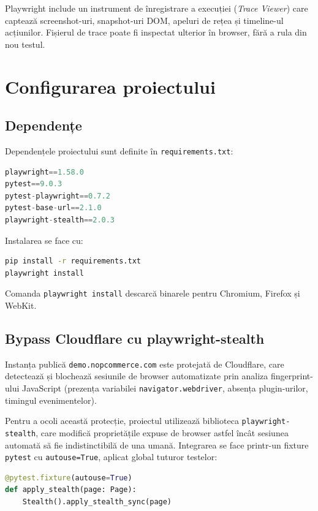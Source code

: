 Playwright include un instrument de înregistrare a execuției (\textit{Trace Viewer}) care
captează screenshot-uri, snapshot-uri DOM, apeluri de rețea și timeline-ul acțiunilor.
Fișierul de trace poate fi inspectat ulterior în browser, fără a rula din nou testul.

\section{Configurarea proiectului}

\subsection{Dependențe}

Dependențele proiectului sunt definite în \texttt{requirements.txt}:

\begin{lstlisting}[language=Python, caption={requirements.txt}]
playwright==1.58.0
pytest==9.0.3
pytest-playwright==0.7.2
pytest-base-url==2.1.0
playwright-stealth==2.0.3
\end{lstlisting}

Instalarea se face cu:

\begin{lstlisting}[language=bash]
pip install -r requirements.txt
playwright install
\end{lstlisting}

Comanda \texttt{playwright install} descarcă binarele pentru Chromium, Firefox și WebKit.

\subsection{Bypass Cloudflare cu playwright-stealth}

Instanța publică \texttt{demo.nopcommerce.com} este protejată de Cloudflare, care detectează
și blochează sesiunile de browser automatizate prin analiza fingerprint-ului JavaScript
(prezența variabilei \texttt{navigator.webdriver}, absența plugin-urilor, timingul evenimentelor).

Pentru a ocoli această protecție, proiectul utilizează biblioteca \texttt{playwright-stealth},
care modifică proprietățile expuse de browser astfel încât sesiunea automată să fie
indistinctibilă de una umană. Integrarea se face printr-un fixture \texttt{pytest} cu
\texttt{autouse=True}, aplicat global tuturor testelor:

\begin{lstlisting}[language=Python, caption={Fixture global pentru stealth mode}]
@pytest.fixture(autouse=True)
def apply_stealth(page: Page):
    Stealth().apply_stealth_sync(page)
\end{lstlisting}

